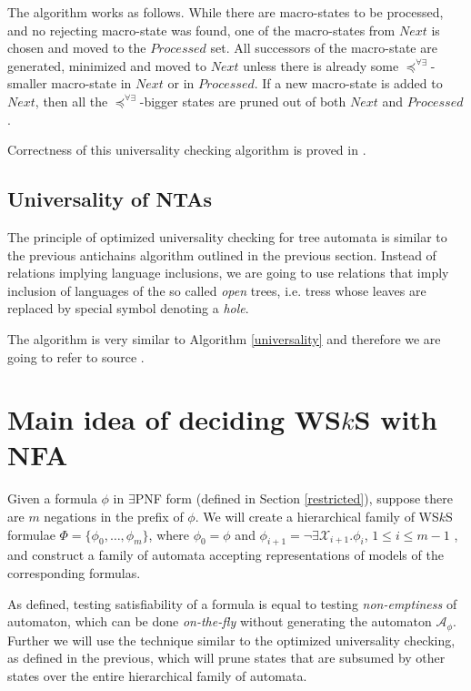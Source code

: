 	The algorithm works as follows. While there are macro-states to be processed, and no rejecting macro-state was found, one of the macro-states from $Next$ is chosen and moved to the $Processed$ set. All successors of the macro-state are generated, minimized and moved to $Next$ unless there is already some $\preceq^{\forall\exists}$-smaller macro-state in $Next$ or in $Processed$. If a new macro-state is added to $Next$, then all the $\preceq^{\forall\exists}$-bigger states are pruned out of both $Next$ and $Processed$. 
	
	Correctness of this universality checking algorithm is proved in \cite{tacas}.

\subsection{Universality of NTAs}

The principle of optimized universality checking for tree automata is similar to the previous antichains algorithm outlined in the previous section. Instead of relations implying language inclusions, we are going to use relations that imply inclusion of languages of the so called \emph{open} trees, i.e. tress whose leaves are replaced by special symbol denoting a \emph{hole}.

The algorithm is very similar to Algorithm \ref{universality} and therefore we are going to refer to source \cite{tacas}.

\section{Main idea of deciding WS$k$S with NFA}

Given a formula $\phi$ in $\exists$PNF form (defined in Section \ref{restricted}), suppose there are $m$ negations in the prefix of $\phi$. We will create a hierarchical family of WS$k$S formulae $\Phi = \{\phi_0,\ldots,\phi_m\}$, where $\phi_0 = \phi$ and $\phi_{i+1} = \neg\exists\mathcal{X}_{i+1}.\phi_i$, $1 \leq i \leq m-1$ , and construct a family of automata accepting representations of models of the corresponding formulas.

As defined, testing satisfiability of a formula is equal to testing \emph{non-emptiness} of automaton, which can be done \emph{on-the-fly} without generating the automaton $\mathcal{A}_\phi$. Further we will use the technique similar to the optimized universality checking, as defined in the previous, which will prune states that are subsumed by other states over the entire hierarchical family of automata.

